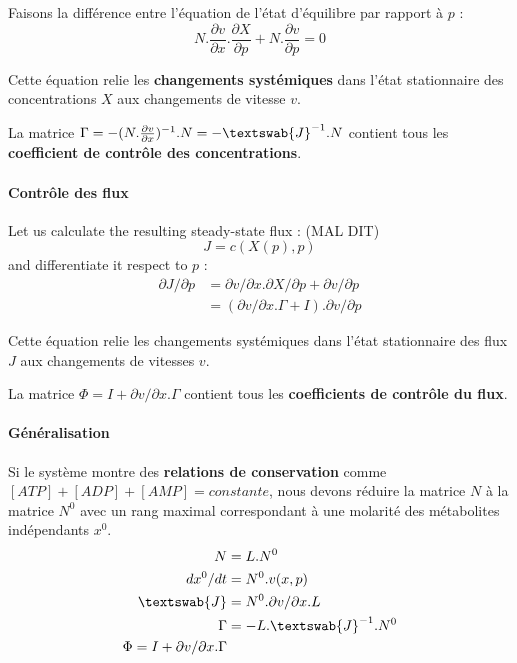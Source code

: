 Faisons la différence entre l'équation de l'état d'équilibre par rapport à $p$ :
$$ N . \frac{\partial v}{\partial x} . \frac{ \partial X}{\partial p} + N . \frac{\partial v}{\partial p} = 0 $$


Cette équation relie les \textbf{changements systémiques} dans l'état stationnaire des concentrations $X$ aux changements de vitesse $v$.

La matrice $ \Gamma = - (N. \frac{\partial v}{\partial x})^{-1} . N  = - \textswab{J}^{-1} . N $ contient tous les \textbf{coefficient de contrôle des concentrations}.


\paragraph{Contrôle des flux}
Let us calculate the resulting steady-state flux : (MAL DIT) 
	$$ J=c(X(p),p) $$
and differentiate it respect to $p$ :
\begin{align*}
	\partial J / \partial p & = \partial v / \partial x . \partial X / \partial p + \partial v / \partial p \\
							& = ( \partial v / \partial x . \Gamma + I ) . \partial v/ \partial p 
\end{align*}

Cette équation relie les changements systémiques dans l'état stationnaire des flux $J$ aux changements de vitesses $v$.

La matrice $ \Phi = I + \partial v / \partial x . \Gamma $ contient tous les \textbf{coefficients de contrôle du flux}. 



\paragraph{Généralisation}
Si le système montre des \textbf{relations de conservation} comme $[ATP]+[ADP]+[AMP] = constante$, nous devons réduire la matrice $N$ à la matrice $N^0$ avec un rang maximal correspondant à une molarité des métabolites indépendants $x^0$.
\begin{align*}
	N & = L. N^0 \\
	dx^0/dt &= N^0 . v(x,p) \\
	\textswab{J} &= N^0 . \partial v / \partial x . L \\
	\Gamma & = - L . \textswab{J} ^{-1} . N^0 \\
	\Phi = I + \partial v / \partial x . \Gamma
\end{align*}




